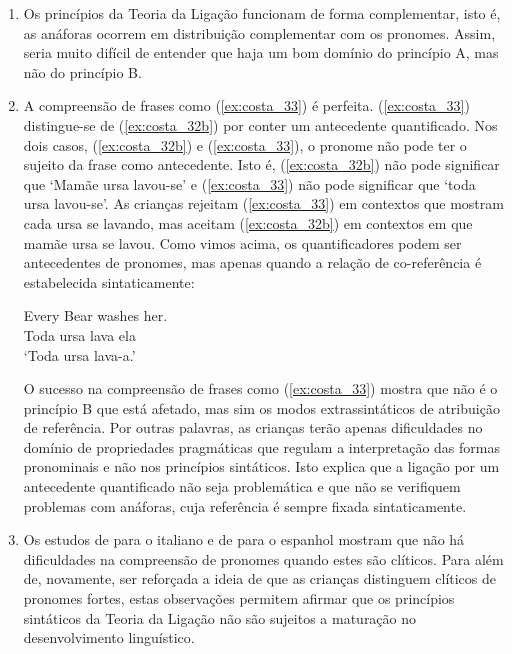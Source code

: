 \documentclass[output=paper]{LSP/langsci}
\begin{document}
\begin{enumerate}[label=\alph*)]
\item Os princípios da Teoria da Ligação funcionam de forma complementar, isto é, as anáforas ocorrem em distribuição complementar com os pronomes. Assim, seria muito difícil de entender que haja um bom domínio do princípio A, mas não do princípio B.
\item A compreensão de frases como (\ref{ex:costa_33}) é perfeita. (\ref{ex:costa_33}) distingue-se de (\ref{ex:costa_32b}) por conter um antecedente quantificado. Nos dois casos, (\ref{ex:costa_32b}) e (\ref{ex:costa_33}), o pronome não pode ter o sujeito da frase como antecedente. Isto é, (\ref{ex:costa_32b}) não pode significar que `Mamãe ursa lavou-se’ e (\ref{ex:costa_33}) não pode significar que `toda ursa lavou-se’. As crianças rejeitam (\ref{ex:costa_33}) em contextos que mostram cada ursa se lavando, mas aceitam (\ref{ex:costa_32b}) em contextos em que mamãe ursa se lavou.  Como vimos acima, os quantificadores podem ser antecedentes de pronomes, mas apenas quando a relação de co-referência é estabelecida sintaticamente:

\ea\label{ex:costa_33}
\gll Every Bear washes her.\\
Toda ursa lava ela\\
\glt `Toda ursa lava-a.'
\z

O sucesso na compreensão de frases como (\ref{ex:costa_33}) mostra que não é o princípio B que está afetado, mas sim os modos extrassintáticos de atribuição de referência. Por outras palavras, as crianças terão apenas dificuldades no domínio de propriedades pragmáticas que regulam a interpretação das formas pronominais e não nos princípios sintáticos. Isto explica que a ligação por um antecedente quantificado não seja problemática e que não se verifiquem problemas com anáforas, cuja referência é sempre fixada sintaticamente.

\item Os estudos de \citet{mckee1992} para o italiano e de \citet{padilha1990} para o espanhol  mostram que não há dificuldades na compreensão de pronomes quando estes são clíticos. Para além de, novamente, ser reforçada a ideia de que as crianças distinguem clíticos de pronomes fortes, estas observações permitem afirmar que os princípios sintáticos da Teoria da Ligação não são sujeitos a maturação no desenvolvimento linguístico.

\end{enumerate}
\end{document}
